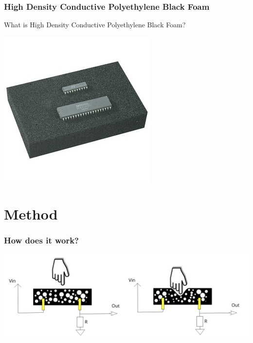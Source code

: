 \documentclass{beamer}
\begin{document}
\begin{frame}
    \frametitle{High Density Conductive
Polyethylene Black Foam}
    What is High Density Conductive Polyethylene Black Foam?
    \begin{center}
        \includegraphics[width=.5\textwidth]{img/foam.jpg}
    \end{center}
\end{frame}

\section{Method}%
\label{sec:Method}


\begin{frame}
    \frametitle{How does it work?}
    \begin{center}
        \includegraphics[width=\textwidth]{img/foam_howto.png}
    \end{center}
\end{frame}
\end{document}
